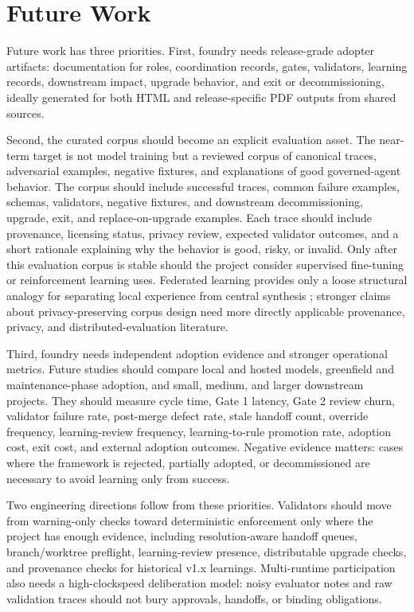 \documentclass[conference]{IEEEtran}
\begin{document}
\section{Future Work}

Future work has three priorities. First, foundry needs release-grade adopter artifacts: documentation for roles, coordination records, gates, validators, learning records, downstream impact, upgrade behavior, and exit or decommissioning, ideally generated for both HTML and release-specific PDF outputs from shared sources.

Second, the curated corpus should become an explicit evaluation asset. The near-term target is not model training but a reviewed corpus of canonical traces, adversarial examples, negative fixtures, and explanations of good governed-agent behavior. The corpus should include successful traces, common failure examples, schemas, validators, negative fixtures, and downstream decommissioning, upgrade, exit, and replace-on-upgrade examples. Each trace should include provenance, licensing status, privacy review, expected validator outcomes, and a short rationale explaining why the behavior is good, risky, or invalid. Only after this evaluation corpus is stable should the project consider supervised fine-tuning or reinforcement learning uses. Federated learning provides only a loose structural analogy for separating local experience from central synthesis \cite{mcmahan2017communication}; stronger claims about privacy-preserving corpus design need more directly applicable provenance, privacy, and distributed-evaluation literature.

Third, foundry needs independent adoption evidence and stronger operational metrics. Future studies should compare local and hosted models, greenfield and maintenance-phase adoption, and small, medium, and larger downstream projects. They should measure cycle time, Gate 1 latency, Gate 2 review churn, validator failure rate, post-merge defect rate, stale handoff count, override frequency, learning-review frequency, learning-to-rule promotion rate, adoption cost, exit cost, and external adoption outcomes. Negative evidence matters: cases where the framework is rejected, partially adopted, or decommissioned are necessary to avoid learning only from success.

Two engineering directions follow from these priorities. Validators should move from warning-only checks toward deterministic enforcement only where the project has enough evidence, including resolution-aware handoff queues, branch/worktree preflight, learning-review presence, distributable upgrade checks, and provenance checks for historical v1.x learnings. Multi-runtime participation also needs a high-clockspeed deliberation model: noisy evaluator notes and raw validation traces should not bury approvals, handoffs, or binding obligations.
\end{document}
